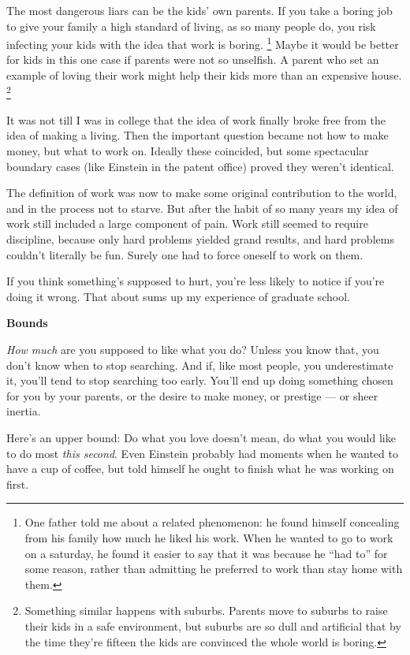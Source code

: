 The most dangerous liars can be the kids' own parents. If you take a
boring job to give your family a high standard of living, as so many
people do, you risk infecting your kids with the idea that work is
boring. \footnote{One father told me about a related phenomenon: he found himself
concealing from his family how much he liked his work. When he wanted to
go to work on a saturday, he found it easier to say that it was because
he ``had to'' for some reason, rather than admitting he preferred to
work than stay home with them.} Maybe it would be better for kids in
this one case if parents were not so unselfish. A parent who set an
example of loving their work might help their kids more than an
expensive house. \footnote{Something similar happens with suburbs. Parents move to suburbs
to raise their kids in a safe environment, but suburbs are so dull and
artificial that by the time they're fifteen the kids are convinced the
whole world is boring.}

It was not till I was in college that the idea of work finally broke
free from the idea of making a living. Then the important question
became not how to make money, but what to work on. Ideally these
coincided, but some spectacular boundary cases (like Einstein in the
patent office) proved they weren't identical.

The definition of work was now to make some original contribution to the
world, and in the process not to starve. But after the habit of so many
years my idea of work still included a large component of pain. Work
still seemed to require discipline, because only hard problems yielded
grand results, and hard problems couldn't literally be fun. Surely one
had to force oneself to work on them.

If you think something's supposed to hurt, you're less likely to notice
if you're doing it wrong. That about sums up my experience of graduate
school.

\textbf{Bounds}

\emph{How much} are you supposed to like what you do? Unless you know
that, you don't know when to stop searching. And if, like most people,
you underestimate it, you'll tend to stop searching too early. You'll
end up doing something chosen for you by your parents, or the desire to
make money, or prestige --- or sheer inertia.

Here's an upper bound: Do what you love doesn't mean, do what you would
like to do most \emph{this second}. Even Einstein probably had moments
when he wanted to have a cup of coffee, but told himself he ought to
finish what he was working on first.

